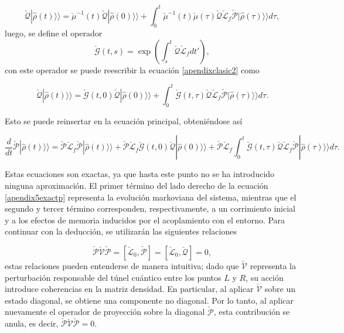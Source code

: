 \begin{appendixs}
\begin{equation}
    \check{\mathcal{Q}}|\hat{\rho}(t)\rangle \rangle  = \check{\mu}^{-1}(t)\check{\mathcal{Q}}|\hat{\rho}(0)\rangle \rangle  + \int_{0}^{t}\check{\mu}^{-1}(t)\check{\mu}(\tau)\check{\mathcal{Q}}\check{\mathcal{L}}_{f} \check{\mathcal{P}}|\hat{\rho}(\tau)\rangle \rangle d\tau,    
    \label{apendixclasic2}
\end{equation}
luego, se define el operador 
\begin{equation*}
    \check{\mathcal{G}}(t,s) = \exp\left(  \int_{s}^{t}\check{\mathcal{Q}}\check{\mathcal{L}}_{f}dt' \right),
\end{equation*}
con este operador se puede reescribir la ecuación \ref{apendixclasic2} como

\begin{equation*}
    \check{\mathcal{Q}}|\hat{\rho}(t)\rangle \rangle = \check{\mathcal{G}}(t,0)\check{\mathcal{Q}}|\hat{\rho}(0)\rangle \rangle  + \int_{0}^{t}\check{\mathcal{G}}(t,\tau)\check{\mathcal{Q}}\check{\mathcal{L}}_{f} \check{\mathcal{P}}|\hat{\rho}(\tau)\rangle \rangle d\tau.    
\end{equation*}

Esto se puede reinsertar en la ecuación principal, obteniéndose así

\begin{equation}
    \frac{d}{dt}\check{\mathcal{P}}|\hat{\rho}(t)\rangle \rangle  = \check{\mathcal{P}}\check{\mathcal{L}}_{f}\check{\mathcal{P}}|\hat{\rho}(t)\rangle \rangle  + \check{\mathcal{P}}\check{\mathcal{L}}_{f}\check{\mathcal{G}}(t,0)\check{\mathcal{Q}}|\hat{\rho}(0)\rangle \rangle  + \check{\mathcal{P}}\check{\mathcal{L}}_{f}\int_{0}^{t}\check{\mathcal{G}}(t,\tau)\check{\mathcal{Q}}\check{\mathcal{L}}_{f} \check{\mathcal{P}}|\hat{\rho}(\tau)\rangle \rangle d\tau.    
    \label{apendix5exactp}
\end{equation}

Estas ecuaciones son exactas, ya que hasta este punto no se ha introducido ninguna aproximación. El primer término del lado derecho de la ecuación \ref{apendix5exactp} representa la evolución markoviana del sistema, mientras que el segundo y tercer término corresponden, respectivamente, a un corrimiento inicial y a los efectos de memoria inducidos por el acoplamiento con el entorno. Para continuar con la deducción, se utilizarán las siguientes relaciones

\begin{equation*}
    \check{\mathcal{P}}\check{\mathcal{V}}\check{\mathcal{P}} = [\check{\mathcal{L}}_0,\check{\mathcal{P}}] = [\check{\mathcal{L}}_0,\check{\mathcal{Q}}] = 0, 
\end{equation*}
estas relaciones pueden entenderse de manera intuitiva; dado que $\check{\mathcal{V}}$ representa la perturbación responsable del túnel cuántico entre los puntos $L$ y $R$, su acción introduce coherencias en la matriz densidad. En particular, al aplicar $\check{\mathcal{V}}$ sobre un estado diagonal, se obtiene una componente no diagonal. Por lo tanto, al aplicar nuevamente el operador de proyección sobre la diagonal $\check{\mathcal{P}}$, esta contribución se anula, es decir, $\check{\mathcal{P}} \check{\mathcal{V}} \check{\mathcal{P}} = 0$.


\end{appendixs}
